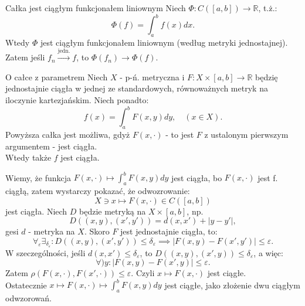 \documentclass{article}
\numberwithin{defi}{section}
\numberwithin{defi}{section}
\newcommand{\R}{\mathbb{R}}
\providecommand{\eps}{\varepsilon}
\renewcommand{\leq}{\leqslant}
\newcommand{\tojedn}{\xrightarrow{\text{jedn.}}}
\begin{document}
\begin{obs}{Całka jest ciągłym funkcjonałem liniownym}
    Niech $\Phi: C([a, b]) \to \R$, t.ż.: \begin{equation}
        \Phi(f) = \int_{a}^{b} f (x) dx.
    \end{equation} Wtedy $\Phi$ jest ciągłym funkcjonałem liniownym (według metryki jednostajnej).\\
    Zatem jeśli $f_n \tojedn f$, to $\Phi(f_n) \to \Phi(f)$.
\end{obs}

\begin{twier}[label=twier:cal-par1]{O całce z parametrem}
    Niech $X$ - p-ń. metryczna i $F: X \times [a, b] \to \R$ będzię jednostajnie ciągła w jednej ze standardowych, równoważnych metryk na iloczynie kartezjańskim. Niech ponadto: \begin{equation}
        f(x) = \int_{a}^{b} F(x, y) dy, \quad (x \in X).
    \end{equation} Powyższa całka jest możliwa, gdyż $F(x, \cdot)$ - to jest $F$ z ustalonym pierwszym argumentem - jest ciągła. \\
    Wtedy także $f$ jest ciągła.
\end{twier}


\begin{dow}{}
    Wiemy, że funkcja $F(x, \cdot) \mapsto \int_{a}^{b} F(x, y) dy$ jest ciągła, bo $F(x, \cdot)$ jest f. ciągłą, zatem wystarczy pokazać, że odwozrowanie: \begin{equation*}
        X \ni x \mapsto F(x, \cdot) \in C([a, b])
    \end{equation*} jest ciągła. Niech $D$ będzie metryką na $X \times [a, b]$, np. \begin{equation*}
        D((x, y), (x', y')) = d(x, x') + |y - y'|,
    \end{equation*} gesi $d$ - metryka na $X$. Skoro $F$ jest jednostajnie ciągła, to: \begin{equation*}
        \forall_{\eps} \exists_{\delta_\eps}: D((x, y), (x', y')) \leq \delta_\eps \implies |F(x, y) - F(x', y')| \leq \eps.
    \end{equation*} W szeczególności, jeśli $d(x, x') \leq \delta_\eps$, to $D((x, y), (x', y)) \leq \delta_\eps$, a więc: \begin{equation*}
        \forall){y}: |F(x, y) - F(x', y)| \leq \eps.
    \end{equation*} Zatem $\rho(F(x, \cdot), F(x', \cdot)) \leq \eps$. Czyli $x \mapsto F(x, \cdot)$ jest ciągłe. \\
    Ostatecznie $x \mapsto F(x, \cdot) \mapsto \int_{a}^{b} F(x, y) dy$ jest ciągłe, jako złożenie dwu ciągłym odwzorowań.
\end{dow}
\end{document}
